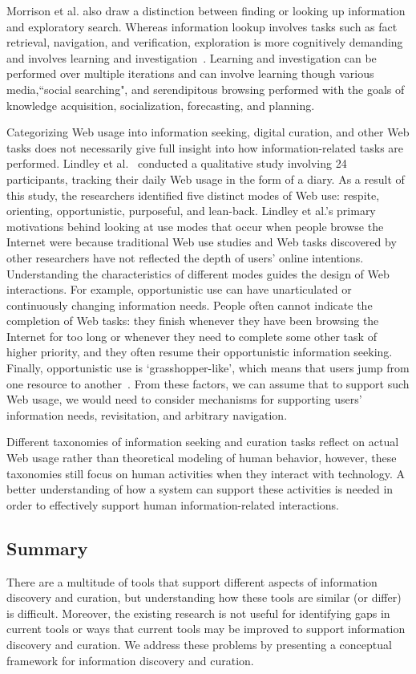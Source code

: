 \documentclass{sigchi}
\begin{document}
Morrison et al. also draw a distinction between finding or looking up information and exploratory search. Whereas information lookup involves tasks such as fact retrieval, navigation, and verification, exploration is more cognitively demanding and involves learning and investigation~\cite{marchionini2006exploratory}. Learning and investigation can be performed over multiple iterations and can involve learning though various media,``social searching", and serendipitous browsing performed with the goals of knowledge acquisition, socialization, forecasting, and planning.  

Categorizing Web usage into information seeking, digital curation, and other Web tasks does not necessarily give full insight into how information-related tasks are performed. Lindley et al.~\cite{lindley2012s} conducted a qualitative study involving 24 participants, tracking their daily Web usage in the form of a diary. As a result of this study, the researchers identified five distinct modes of Web use: respite, orienting, opportunistic, purposeful, and lean-back. Lindley et al.'s primary motivations behind looking at use modes that occur when people browse the Internet were because traditional Web use studies and Web tasks discovered by other researchers have not reflected the depth of users' online intentions. Understanding the characteristics of different modes guides the design of Web interactions. For example, opportunistic use can have unarticulated or continuously changing information needs. People often cannot indicate the completion of Web tasks: they finish whenever they have been browsing the Internet for too long or whenever they need to complete some other task of higher priority, and they often resume their opportunistic information seeking. Finally, opportunistic use is `grasshopper-like', which means that users jump from one resource to another~\cite{lindley2012s}. From these factors, we can assume that to support such Web usage, we would need to consider mechanisms for supporting users' information needs, revisitation, and arbitrary navigation.

Different taxonomies of information seeking and curation tasks reflect on actual Web usage rather than theoretical modeling of human behavior, however, these taxonomies still focus on human activities when they interact with technology. A better understanding of how a system can support these activities is needed in order to effectively support human information-related interactions. 

\subsection{Summary}
There are a multitude of tools that support different aspects of information discovery and curation, but understanding how these tools are similar (or differ) is difficult. Moreover, the existing research is not useful for identifying gaps in current tools or ways that current tools may be improved to support information discovery and curation. We address these problems by presenting a conceptual framework for information discovery and curation.
\end{document}
